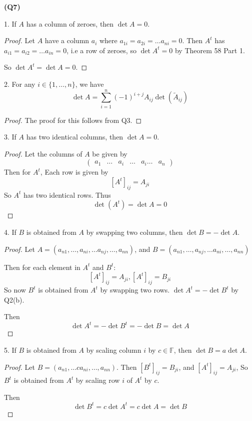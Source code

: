 \documentclass[12pt, a4paper]{article}
\newcommand{\F}{\mathbb{F}}
\begin{document}
\textbf{(Q7)}

1. If $A$ has a column of zeroes, then $\det A = 0$.
\begin{proof}
    Let $A$ have a column $a_i$ where $a_{1i} = a_{2i} = \ldots a_{ni}= 0$.
    Then $A^t$ has $a_{i1} = a_{i2} = \ldots a_{in}= 0$, i.e a row
    of zeroes, so $\det A^t = 0$ by Theorem 58 Part 1.

    So $\det A^t = \det A = 0$.
\end{proof}

2. For any $i \in \{1,\ldots,n\}$, we have
\[
    \det A = \sum_{i = 1}^{n} (-1)^{i + j} A_{ij} \det (\tilde{A}_{ij})
\]
\begin{proof}
    The proof for this follows from Q3.
\end{proof}

3. If $A$ has two identical columns, then $\det A = 0$.
\begin{proof}
    Let the columns of $A$ be given by
    \[
        \begin{pmatrix}
            a_1 & \dots & a_i & \dots & a_i \dots & a_n
        \end{pmatrix}
    \]
    Then for $A^t$, Each row is given by
    \[
        [A^t]_{ij} = A_{ji}
    \]
    So $A^t$ has two identical rows. Thus
    \[
        \det (A^t) = \det A = 0
    \]
\end{proof}

4. If $B$ is obtained from $A$ by swapping two columns, then
$\det B = -\det A$.
\begin{proof}
    Let $A = \left(a_{n1}, \dots, a_{ni}, \dots a_{nj}, \dots, a_{nn}\right)$,
    and $B = \left(a_{n1}, \dots, a_{nj}, \dots a_{ni}, \dots, a_{nn}\right)$

    Then for each element in $A^t$ and $B^t$:
    \[
        [A^t]_{ij} = A_{ji}, [A^t]_{ij} = B_{ji}
    \]
    So now $B^t$ is obtained from $A^t$ by swapping two rows.
    $\det A^t = - \det B^t$ by Q2(b).

    Then 
    \[
        \det A^t = -\det B^t = -\det B = \det A
    \]
\end{proof}

5. If $B$ is obtained from $A$ by scaling column $i$ by $c \in \F$, then
$\det B = a \det A$.
\begin{proof}
    Let $B = \left(a_{n1}, \dots ca_{ni}, \dots, a_{nn}\right)$.
    Then $[B^t]_{ij} = B_{ji}$, and $[A^t]_{ij} = A_{ji}$,
    So $B^t$ is obtained from $A^t$ by scaling row $i$ of $A^t$
    by $c$.

    Then
    \[
        \det B^t = c \det A^t = c \det A = \det B
    \]
\end{proof}
\end{document}

